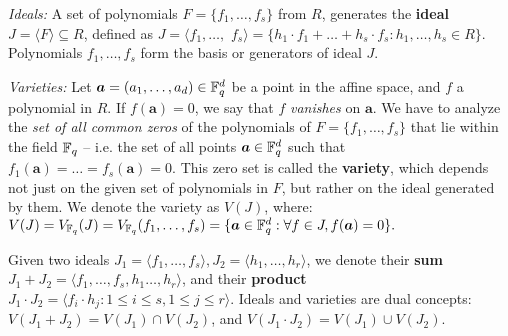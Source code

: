 
{\it Ideals:} A set of polynomials 
$F=\{f_1,\dots,f_s\}$ from $R$, generates the {\bf ideal} $J = \langle
F \rangle \subseteq R$, defined as $J = \langle f_1,\dots,$ $ f_s \rangle = \{
h_1\cdot f_1 + \dots+h_s\cdot f_s:  h_1,\dots,h_s\in R\}$. 
Polynomials $f_1,\dots,f_s$ form the basis or generators of ideal $J$.

{\it Varieties:} Let $\bm{a} = (a_1,\dots,a_d) \in {\mathbb{F}}_{q}^d$ be a point in the affine
space, and $f$ a polynomial in $R$. If $f(\bm{a}) = 0$, we say
that $f$ {\it vanishes} on $\bm{a}$. We have to
analyze the {\it set of all common zeros} of the polynomials of $F =
\{f_1,\dots,f_s\}$  that lie within the field ${\mathbb{F}}_{q}$ -- i.e. the set of
all points $\bm{a} \in {\mathbb{F}}_{q}^d$ such that
$f_1(\bm{a})=\dots=f_s(\bm{a})=0$. This zero set is called the {\bf
  variety}, which depends not just on the given set of polynomials in
$F$, but rather on the ideal generated by them. We denote the variety as
$V(J)$, where: $ V(J)= V_{{\mathbb{F}}_{q}}(J) = V_{{\mathbb{F}}_{q}}(f_1,\dots,f_s) = \{\bm{a}
\in {\mathbb{F}}_{q}^d: \forall f \in J, f(\bm{a}) = 0\}.$


Given two ideals $J_1 = \langle f_1,\dots,f_s\rangle, J_2=\langle
h_1,\dots,h_r\rangle$, we denote their {\bf sum} $J_1 + J_2 = \langle
f_1,\dots,f_s,h_1\dots,h_r\rangle$, and their {\bf product} $J_1\cdot J_2 =
\langle f_i\cdot h_j: 1\leq i\leq s, 1\leq j\leq r\rangle$.
Ideals and varieties are dual concepts: $V(J_1 + J_2) = V(J_1) \cap
V(J_2)$, and $V(J_1\cdot J_2) = V(J_1) \cup V(J_2)$.

